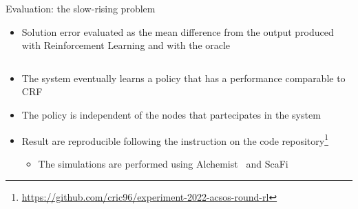 \documentclass[9pt, aspectratio=169, handout]{beamer}
\begin{document}
\begin{frame}{Evaluation: the slow-rising problem}
\begin{card}
\begin{itemize}
      \item Solution error evaluated as the mean difference from the output produced with Reinforcement Learning and with the oracle
    \end{itemize}
  \end{card}  
  \begin{columns}
    \begin{column}{0.3\textwidth}
    \end{column}
    \begin{column}{0.38\textwidth}
    \end{column}  
  \end{columns}
  \begin{card}[Results]
    \begin{itemize}
      \item The system eventually learns a policy that has a performance comparable to CRF
      \item The policy is independent of the nodes that partecipates in the system
      \item Result are reproducible following the instruction on the code repository\footnote[frame]{\url{https://github.com/cric96/experiment-2022-acsos-round-rl}}
      \begin{itemize}
        \item The simulations are performed using Alchemist~\cite{alchemist-jos2013} and ScaFi~\cite{DBLP:conf/isola/CasadeiVAD20} 
      \end{itemize}
    \end{itemize}
  \end{card}
  \begin{multicols}{3}
  \end{multicols}
\end{frame}
\end{document}
